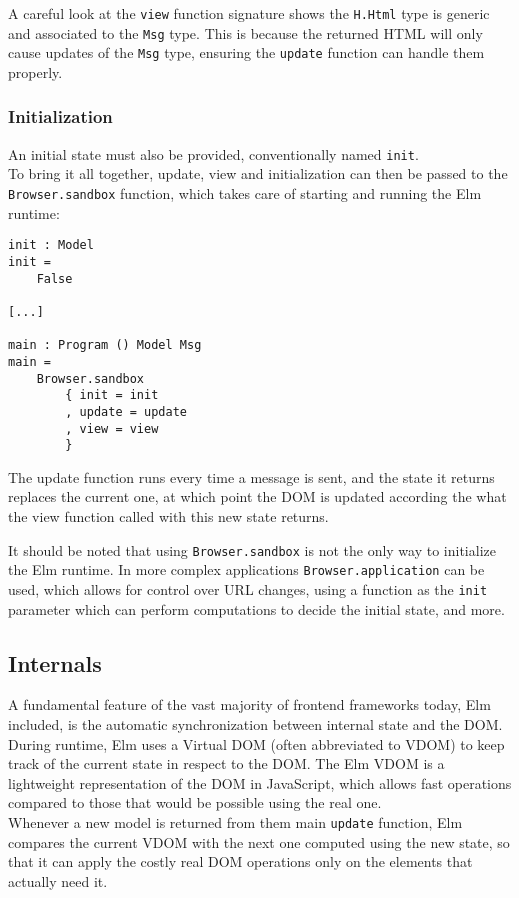 A careful look at the \texttt{view} function signature shows the \texttt{H.Html} type is generic and associated to the \texttt{Msg} type. This is because the returned HTML will only cause updates of the \texttt{Msg} type, ensuring the \texttt{update} function can handle them properly.

\subsubsection{Initialization}
An initial state must also be provided, conventionally named \texttt{init}.\\
To bring it all together, update, view and initialization can then be passed to the \texttt{Browser.sandbox} function, which takes care of starting and running the Elm runtime:
\begin{verbatim}
init : Model
init =
    False

[...]

main : Program () Model Msg
main =
    Browser.sandbox
        { init = init
        , update = update
        , view = view
        }
\end{verbatim}

The update function runs every time a message is sent, and the state it returns replaces the current one, at which point the DOM is updated according the what the view function called with this new state returns.

It should be noted that using \texttt{Browser.sandbox} is not the only way to initialize the Elm runtime. In more complex applications \texttt{Browser.application} can be used, which allows for control over URL changes, using a function as the \texttt{init} parameter which can perform computations to decide the initial state, and more.

\subsection{Internals}
A fundamental feature of the vast majority of frontend frameworks today, Elm included, is the automatic synchronization between internal state and the DOM.\\

During runtime, Elm uses a Virtual DOM (often abbreviated to VDOM) to keep track of the current state in respect to the DOM. The Elm VDOM is a lightweight representation of the DOM in JavaScript, which allows fast operations compared to those that would be possible using the real one. \cite{noauthor_htmllazy_nodate}\\

Whenever a new model is returned from them main \texttt{update} function, Elm compares the current VDOM with the next one computed using the new state, so that it can apply the costly real DOM operations only on the elements that actually need it.\\

